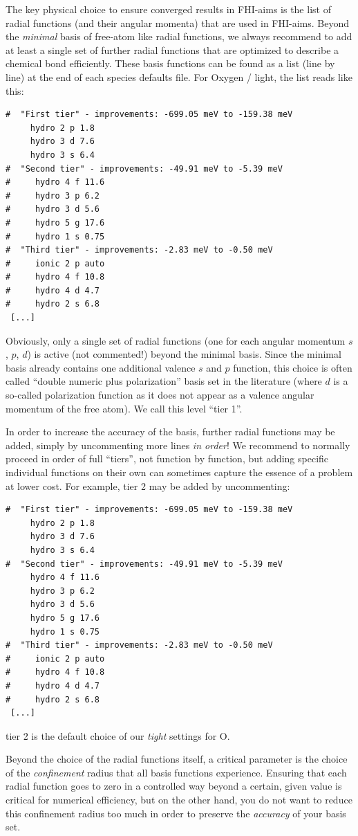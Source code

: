 The key physical choice to ensure converged results in FHI-aims is the list of
radial functions (and their angular momenta) that are used in FHI-aims. Beyond
the \emph{minimal} basis of free-atom like radial functions, we always
recommend to add at least a single set of further radial functions that are
optimized to describe a chemical bond efficiently. These basis functions can
be found as a list (line by line) at the end of each species defaults
file. For Oxygen / light, the list reads like this:
\begin{verbatim}
#  "First tier" - improvements: -699.05 meV to -159.38 meV
     hydro 2 p 1.8
     hydro 3 d 7.6
     hydro 3 s 6.4
#  "Second tier" - improvements: -49.91 meV to -5.39 meV
#     hydro 4 f 11.6
#     hydro 3 p 6.2
#     hydro 3 d 5.6
#     hydro 5 g 17.6
#     hydro 1 s 0.75
#  "Third tier" - improvements: -2.83 meV to -0.50 meV
#     ionic 2 p auto
#     hydro 4 f 10.8
#     hydro 4 d 4.7
#     hydro 2 s 6.8
 [...]
\end{verbatim}
Obviously, only a single set of radial functions (one for each angular
momentum $s$, $p$, $d$) is active (not commented!) beyond the minimal
basis. Since the minimal basis already contains one additional valence $s$
and $p$ function, this choice is often called ``double numeric plus
polarization'' basis set in the literature (where $d$ is a so-called
polarization function as it does not appear as a valence angular momentum of
the free atom). We call this level ``tier 1''. 

In order to increase the accuracy of the basis, further radial functions may
be added, simply by uncommenting more lines \emph{in order}! We
recommend to normally proceed in order of full ``tiers'', not function by
function, but adding specific individual functions on their own
can sometimes capture the essence of a problem at lower cost.  For
example, tier 2 may be added by uncommenting: 
\begin{verbatim}
#  "First tier" - improvements: -699.05 meV to -159.38 meV
     hydro 2 p 1.8
     hydro 3 d 7.6
     hydro 3 s 6.4
#  "Second tier" - improvements: -49.91 meV to -5.39 meV
     hydro 4 f 11.6
     hydro 3 p 6.2
     hydro 3 d 5.6
     hydro 5 g 17.6
     hydro 1 s 0.75
#  "Third tier" - improvements: -2.83 meV to -0.50 meV
#     ionic 2 p auto
#     hydro 4 f 10.8
#     hydro 4 d 4.7
#     hydro 2 s 6.8
 [...]
\end{verbatim}
tier 2 is the default choice of our \emph{tight} settings for O.

Beyond the choice of the radial functions itself, a critical parameter is the
choice of the \emph{confinement} radius that all basis functions
experience. Ensuring that each radial function goes to zero in a controlled
way beyond a certain, given value is critical for numerical efficiency, but on
the other hand, you do not want to reduce this confinement radius too much in
order to preserve the \emph{accuracy} of your basis set.


